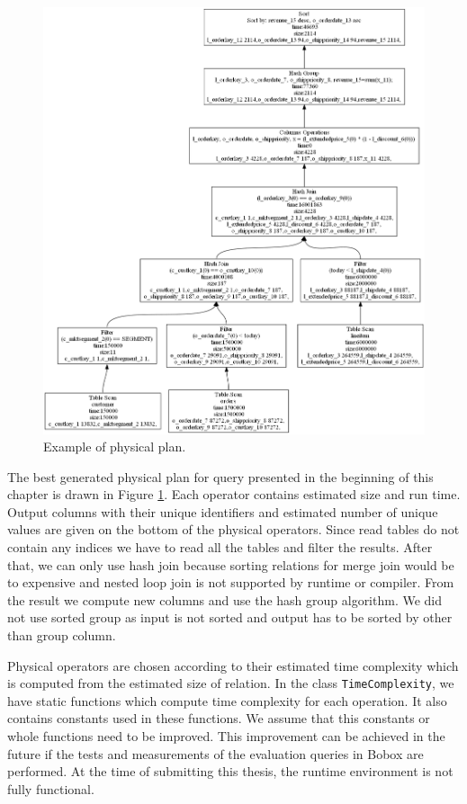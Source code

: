 \begin{figure}[h!]
  \centering
    \includegraphics[width=1.0\textwidth]{physicalplan}

      \caption{Example of physical plan.}
          \label{fig:physicalplan}
\end{figure}


The best generated physical plan for query presented in the beginning of this chapter is drawn in Figure \ref{fig:physicalplan}. Each operator contains estimated size and run time. Output columns with their unique identifiers and estimated number of unique values are given on the bottom of the physical operators. Since read tables do not contain any indices we have to read all the tables and filter the results. After that, we can only use hash join because sorting relations for merge join would be to expensive and nested loop join is not supported by runtime or compiler. From the result we compute new columns and use the hash group algorithm. We did not use sorted group as input is not sorted and output has to be sorted by other than group column.

Physical operators are chosen according to their estimated time complexity which is computed from the estimated size of relation. In the class \texttt{Ti\-me\-Com\-ple\-xi\-ty}, we have static functions which compute time complexity for each operation. It also contains constants used in these functions. We assume that this constants or whole functions need to be improved. This improvement can be achieved in the future if the tests and measurements of the evaluation queries in Bobox are performed. At the time of submitting this thesis, the runtime environment is not fully functional.




